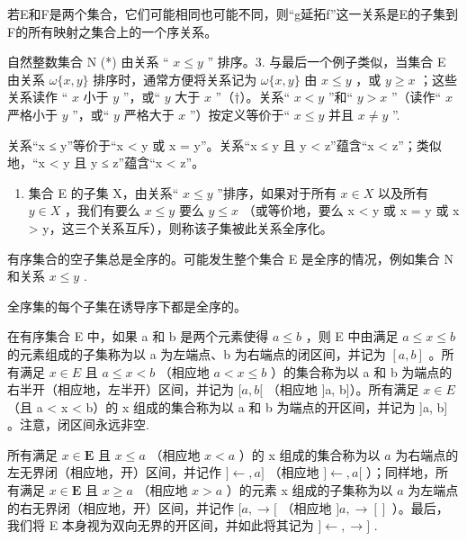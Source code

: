 若E和F是两个集合，它们可能相同也可能不同，则“g延拓f”这一关系是E的子集到F的所有映射之集合上的一个序关系。

自然整数集合 N (*) 由关系 `` \(x \leqslant y\) '' 排序。3. 与最后一个例子类似，当集合 E 由关系 \(\omega\{x, y\}\) 排序时，通常方便将关系记为 \(\omega\{x, y\}\) 由 \(x \leqslant y\) ，或 \(y \geqslant x\) ；这些关系读作 `` \(x\) 小于 \(y\) ''，或`` \(y\) 大于 \(x\) ''（†）。关系`` \(x < y\) ”和“ \(y > x\) ''（读作`` \(x\) 严格小于 \(y\) ''，或`` \(y\) 严格大于 \(x\) ''）按定义等价于`` \(x \leqslant y\) 并且 \(x \neq y\) ''.

关系``x ≤ y''等价于``x \textless{} y 或 x = y''。关系``x ≤ y 且 y \textless{} z''蕴含``x \textless{} z''；类似地，``x \textless{} y 且 y ≤ z''蕴含``x \textless{} z''。

\begin{enumerate}
\def\labelenumi{\arabic{enumi}.}
\setcounter{enumi}{3}
\tightlist
\item
  集合 E 的子集 X，由关系`` \(x \leqslant y\) ''排序，如果对于所有 \(x \in X\) 以及所有 \(y \in X\) ，我们有要么 \(x \leqslant y\) 要么 \(y \leqslant x\) （或等价地，要么 x \textless{} y 或 x = y 或 x \textgreater{} y，这三个关系互斥），则称该子集被此关系全序化。
\end{enumerate}

有序集合的空子集总是全序的。可能发生整个集合 E 是全序的情况，例如集合 N 和关系 \(x \leqslant y\) .

全序集的每个子集在诱导序下都是全序的。

在有序集合 E 中，如果 a 和 b 是两个元素使得 \(a \leqslant b\) ，则 E 中由满足 \(a \leqslant x \leqslant b\) 的元素组成的子集称为以 a 为左端点、b 为右端点的闭区间，并记为 \([a, b]\) 。所有满足 \(x \in E\) 且 \(a \leqslant x < b\) （相应地 \(a < x \leqslant b\) ）的集合称为以 a 和 b 为端点的右半开（相应地，左半开）区间，并记为 \([a, b[\) （相应地 {]}a, b{]}）。所有满足 \(x \in E\) （且 a \textless{} x \textless{} b）的 x 组成的集合称为以 a 和 b 为端点的开区间，并记为 {]}a, b{]} 。注意，闭区间永远非空.

所有满足 \(x \in \mathbf{E}\) 且 \(x \leqslant a\) （相应地 \(x < a\) ）的 x 组成的集合称为以 \(a\) 为右端点的左无界闭（相应地，开）区间，并记作 \(] \leftarrow, a]\) （相应地 \(] \leftarrow, a[\) ）；同样地，所有满足 \(x \in \mathbf{E}\) 且 \(x \geqslant a\) （相应地 \(x > a\) ）的元素 x 组成的子集称为以 \(a\) 为左端点的右无界闭（相应地，开）区间，并记作 \([a, \rightarrow[\) （相应地 \(]a, \rightarrow[]\) ）。最后，我们将 E 本身视为双向无界的开区间，并如此将其记为 \(] \leftarrow, \rightarrow]\) .

